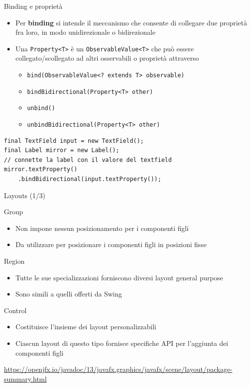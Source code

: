 \documentclass[xcolor=dvipsnames,presentation]{beamer}
\begin{document}
\begin{frame}[fragile]{Binding e proprietà}

\begin{itemize}
\item Per \textbf{binding} si intende il meccanismo che consente di collegare due proprietà fra loro, in modo unidirezionale o bidirezionale
\item Una \texttt{Property<T>} è un \texttt{ObservableValue<T>} che può essere collegato/scollegato ad altri osservabili o proprietà attraverso
\begin{itemize}
\item \texttt{bind(ObservableValue<? extends T> observable)}
\item \texttt{bindBidirectional(Property<T> other)}
\item \texttt{unbind()}
\item \texttt{unbindBidirectional(Property<T> other)}
\end{itemize}
\end{itemize}

\begin{lstlisting}
final TextField input = new TextField();
final Label mirror = new Label();
// connette la label con il valore del textfield
mirror.textProperty()
    .bindBidirectional(input.textProperty());
\end{lstlisting}

\end{frame}

\begin{frame}{Layouts (1/3)}
\begin{block}{Group}
\begin{itemize}
\item Non impone nessun posizionamento per i componenti figli
\item Da utilizzare per posizionare i componenti figli in posizioni fisse
\end{itemize}
\end{block}

\begin{block}{Region}
\begin{itemize}
\item Tutte le sue specializzazioni forniscono diversi layout general purpose
\item Sono simili a quelli offerti da Swing
\end{itemize}
\end{block}

\begin{block}{Control}
\begin{itemize}
\item Costituisce l'insieme dei layout personalizzabili
\item Ciascun layout di questo tipo fornisce specifiche API per l'aggiunta dei componenti figli
\end{itemize}
\end{block}
\url{https://openjfx.io/javadoc/13/javafx.graphics/javafx/scene/layout/package-summary.html}
\end{frame}
\end{document}
